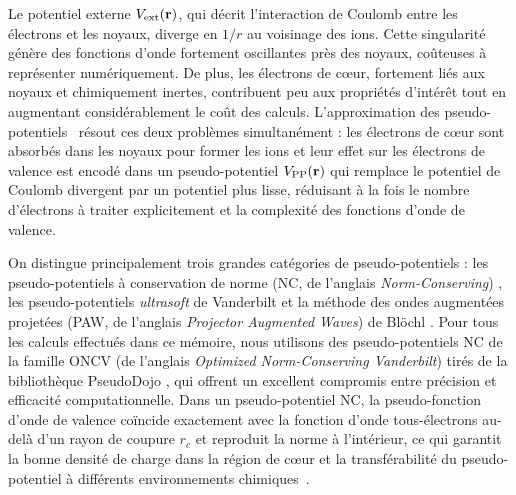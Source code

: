 Le potentiel externe $V_\text{ext}(\mathbf{r})$, qui décrit l'interaction de Coulomb entre les électrons et les noyaux, diverge en $1/r$ au voisinage des ions. Cette singularité génère des fonctions d'onde fortement oscillantes près des noyaux, coûteuses à représenter numériquement. De plus, les électrons de c\oe ur, fortement liés aux noyaux et chimiquement inertes, contribuent peu aux propriétés d'intérêt tout en augmentant considérablement le coût des calculs. L'approximation des pseudo-potentiels~\cite{phillipsEnergyBandInterpolationScheme1958,phillipsNewMethodCalculating1959} résout ces deux problèmes simultanément : les électrons de c\oe ur sont absorbés dans les noyaux pour former les ions et leur effet sur les électrons de valence est encodé dans un pseudo-potentiel $V_\text{PP}(\mathbf{r})$ qui remplace le potentiel de Coulomb divergent par un potentiel plus lisse, réduisant à la fois le nombre d'électrons à traiter explicitement et la complexité des fonctions d'onde de valence.

On distingue principalement trois grandes catégories de pseudo-potentiels : les pseudo-potentiels à conservation de norme (NC, de l'anglais \textit{Norm-Conserving}) \cite{hamannNormConservingPseudopotentials1979}, les pseudo-potentiels \textit{ultrasoft} de Vanderbilt \cite{vanderbiltSoftSelfconsistentPseudopotentials1990} et la méthode des ondes augmentées projetées (PAW, de l'anglais \textit{Projector Augmented Waves}) de Blöchl \cite{blochlProjectorAugmentedwaveMethod1994}. Pour tous les calculs effectués dans ce mémoire, nous utilisons des pseudo-potentiels NC de la famille ONCV (de l'anglais \textit{Optimized Norm-Conserving Vanderbilt}) tirés de la bibliothèque PseudoDojo \cite{vansettenPseudoDojoTrainingGrading2018}, qui offrent un excellent compromis entre précision et efficacité computationnelle. Dans un pseudo-potentiel NC, la pseudo-fonction d'onde de valence coïncide exactement avec la fonction d'onde tous-électrons au-delà d'un rayon de coupure $r_c$ et reproduit la norme à l'intérieur, ce qui garantit la bonne densité de charge dans la région de c\oe ur et la transférabilité du pseudo-potentiel à différents environnements chimiques~\cite{hamannGeneralizedNormconservingPseudopotentials1989,troullierEfficientPseudopotentialsPlanewave1991}.

